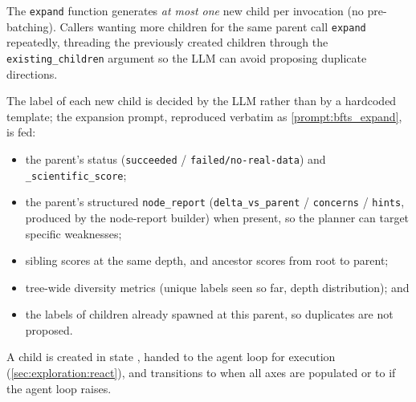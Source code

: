 The \texttt{expand} function generates \emph{at most one} new child
per invocation (no pre-batching). Callers wanting more children for
the same parent call \texttt{expand} repeatedly, threading the
previously created children through the \texttt{existing\_children}
argument so the LLM can avoid proposing duplicate directions.

The label of each new child is decided by the LLM rather than by a
hardcoded template; the expansion prompt, reproduced verbatim as
\cref{prompt:bfts_expand}, is fed:

\begin{itemize}
  \item the parent's status (\texttt{succeeded} /
        \texttt{failed/no-real-data}) and
        \texttt{\_scientific\_score};
  \item the parent's structured \texttt{node\_report}
        (\texttt{delta\_vs\_parent} / \texttt{concerns} /
        \texttt{hints}, produced by the node-report builder) when
        present, so the planner can target specific weaknesses;
  \item sibling scores at the same depth, and ancestor scores from
        root to parent;
  \item tree-wide diversity metrics (unique labels seen so far,
        depth distribution); and
  \item the labels of children already spawned at this parent, so
        duplicates are not proposed.
\end{itemize}

A child is created in state \StateOpen{}, handed to the agent loop
for execution (\cref{sec:exploration:react}), and transitions to
\StateDone{} when all axes are populated or to \StateFailed{} if the
agent loop raises.

